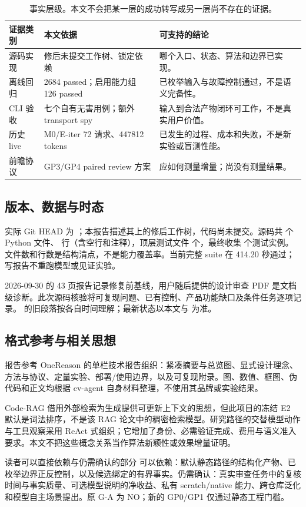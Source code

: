 \begin{table}[htbp]\centering
\begin{tabularx}{\textwidth}{L{29mm}L{45mm}Y}
\toprule 证据类别 & 本文依据 & 可支持的结论\\\midrule
源码实现 & 修后未提交工作树、锁定依赖 & 哪个入口、状态、算法和边界已实现。\\
离线回归 & 2684 passed；启用能力组 126 passed & 已枚举输入与故障控制通过，不是语义完备性。\\
CLI 验收 & 七个自有无害用例；额外 transport spy & 输入到合法产物闭环可工作，不是真实用户价值。\\
历史 live & M0/E-iter 72 请求、447812 tokens & 已发生的过程、成本和失败，不是新实验或盲测性能。\\
前瞻协议 & GP3/GP4 paired review 方案 & 应如何测量增量；尚没有测量结果。\\
\bottomrule
\end{tabularx}
\caption{事实层级。本文不会把某一层的成功转写成另一层尚不存在的证据。}
\label{tab:evidence_levels}
\end{table}

\subsection{版本、数据与时态}
实际 Git HEAD 为 ；本报告描述其上的修后工作树，代码尚未提交。源码共 \ModuleCount{} 个 Python 文件、\SourceLines{} 行（含空行和注释），顶层测试文件 \TestFileCount{} 个，最终收集 \CollectedCases{} 个测试实例。文件数和行数是结构清点，不是能力覆盖率。当前完整 suite 在 414.20 秒通过；写报告不重跑模型或见证实验。\cite{acceptance,baseline}

2026-09-30 的 43 页报告记录修复前基线，用户随后提供的设计审查 PDF 是文档级诊断。此次源码核验将可复现问题、已有控制、产品功能缺口及条件任务逐项记录。 的旧段落按各自时间理解；最新状态以本文与  为准。

\subsection{格式参考与相关思想}
报告参考 OneReason 的单栏技术报告组织：紧凑摘要与总览图、显式设计理念、方法与协议、定量实验、部署/使用边界，以及可复现附录。\cite{onereason}图、数值、框图、伪代码和正文均根据 cv-agent 自身材料整理，不使用其品牌或实验结果。

Code-RAG 借用外部检索为生成提供可更新上下文的思想，但此项目的冻结 E2 默认是词法排序，不是该 RAG 论文中的稠密检索模型。\cite{rag}研究路径的交替模型动作与工具观察采用 ReAct 式组织；\cite{react}它增加了身份、必需验证完成、费用与语义准入要求。本文不把这些概念关系当作算法新颖性或效果增量证明。

\begin{insight}{读者可以直接依赖与仍需确认的部分}
可以依赖：默认静态路径的结构化产物、已枚举边界正反控制，以及候选绑定的有界事实。仍需确认：真实审查任务中的复核时间与事实质量、可选模型说明的净收益、私有 scratch/native 能力、跨仓库泛化和模型自主场景提出。原 G-A 为 NO；新的 GP0/GP1 仅通过静态工程门槛。
\end{insight}
